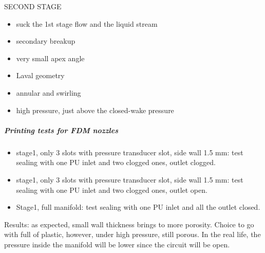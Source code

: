 \documentclass[../../../main.tex]{subfiles}
\begin{document}
\vspace{0mm}
\begin{minipage}{\linewidth}
SECOND STAGE
        \begin{itemize}
        \item[$\Rightarrow$] suck the 1st stage flow and the liquid stream
        \item[$\Rightarrow$] secondary breakup
        \end{itemize}
            \begin{itemize}
            \item very small apex angle
            \item Laval geometry
            \item annular and swirling
            \item high pressure, just above the closed-wake pressure
            \end{itemize}
\end{minipage}
\vspace{0mm}


\subparagraph{Printing tests for FDM nozzles}

\begin{itemize}
    \item stage1, only 3 slots with pressure transducer slot, side wall 1.5 mm: test sealing with one PU inlet and two clogged ones, outlet clogged.
    \item stage1, only 3 slots with pressure transducer slot, side wall 1.5 mm: test sealing with one PU inlet and two clogged ones, outlet open.
    \item Stage1, full manifold: test sealing with one PU inlet and all the outlet closed.
\end{itemize}

Results: as expected, small wall thickness brings to more porosity. Choice to go with full of plastic, however, under high pressure, still porous. In the real life, the pressure 
inside the manifold will be lower since the circuit will be open.






\end{document}
